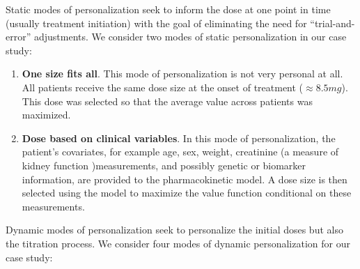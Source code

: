 Static modes of personalization seek to inform the dose at one point in time (usually treatment initiation) with the goal of eliminating the need for ``trial-and-error'' adjustments.  We consider two modes of static personalization in our case study:

\begin{enumerate}
	\item \textbf{One size fits all}.  This mode of personalization is not very personal at all.  All patients receive the same dose size at the onset of treatment ($\approx8.5 mg$). This dose was selected so that the average value across patients was maximized.  
	\item \textbf{Dose based on clinical variables}.  In this mode of personalization, the patient's covariates, for example age, sex, weight, creatinine (a measure of kidney function )measurements, and possibly genetic or biomarker information, are provided to the pharmacokinetic model.  A dose size is then selected using the model to maximize the value function conditional on these measurements.
\end{enumerate}

\noindent Dynamic modes of personalization seek to personalize the initial doses but also the titration process.  We consider four modes of dynamic personalization for our case study:

